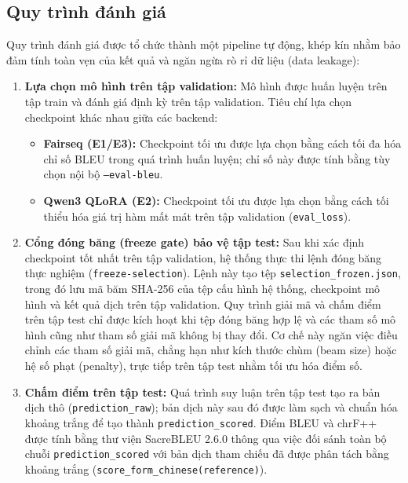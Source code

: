 \subsection{Quy trình đánh giá}

Quy trình đánh giá được tổ chức thành một pipeline tự động, khép kín nhằm bảo đảm tính toàn vẹn của kết quả và ngăn ngừa rò rỉ dữ liệu (data leakage):

\begin{enumerate}
    \item \textbf{Lựa chọn mô hình trên tập validation:}
    Mô hình được huấn luyện trên tập train và đánh giá định kỳ trên tập validation. Tiêu chí lựa chọn checkpoint khác nhau giữa các backend:
    \begin{itemize}
        \item \textbf{Fairseq (E1/E3):} Checkpoint tối ưu được lựa chọn bằng cách tối đa hóa chỉ số BLEU trong quá trình huấn luyện; chỉ số này được tính bằng tùy chọn nội bộ \texttt{--eval-bleu}.
        \item \textbf{Qwen3 QLoRA (E2):} Checkpoint tối ưu được lựa chọn bằng cách tối thiểu hóa giá trị hàm mất mát trên tập validation (\texttt{eval\_loss}).
    \end{itemize}
    
    \item \textbf{Cổng đóng băng (freeze gate) bảo vệ tập test:}
    Sau khi xác định checkpoint tốt nhất trên tập validation, hệ thống thực thi lệnh đóng băng thực nghiệm (\texttt{freeze-selection}). Lệnh này tạo tệp \texttt{selection\_frozen.json}, trong đó lưu mã băm SHA-256 của tệp cấu hình hệ thống, checkpoint mô hình và kết quả dịch trên tập validation. Quy trình giải mã và chấm điểm trên tập test chỉ được kích hoạt khi tệp đóng băng hợp lệ và các tham số mô hình cũng như tham số giải mã không bị thay đổi. Cơ chế này ngăn việc điều chỉnh các tham số giải mã, chẳng hạn như kích thước chùm (beam size) hoặc hệ số phạt (penalty), trực tiếp trên tập test nhằm tối ưu hóa điểm số.
    
    \item \textbf{Chấm điểm trên tập test:}
    Quá trình suy luận trên tập test tạo ra bản dịch thô (\texttt{prediction\_raw}); bản dịch này sau đó được làm sạch và chuẩn hóa khoảng trắng để tạo thành \texttt{prediction\_scored}. Điểm BLEU và chrF++ được tính bằng thư viện SacreBLEU 2.6.0 thông qua việc đối sánh toàn bộ chuỗi \texttt{prediction\_scored} với bản dịch tham chiếu đã được phân tách bằng khoảng trắng (\texttt{score\_form\_chinese(reference)}).
    

\end{enumerate}
